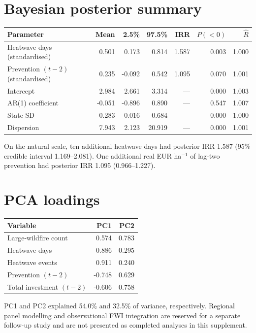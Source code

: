 \documentclass[10pt,a4paper]{article}
\begin{document}
\section{Bayesian posterior summary}
\begin{table}[H]\centering\small
\begin{tabular}{lrrrrrr}
\toprule
Parameter & Mean & 2.5\% & 97.5\% & IRR & $P(<0)$ & $\widehat R$ \\
\midrule
Heatwave days (standardised) & 0.501 & 0.173 & 0.814 & 1.587 & 0.003 & 1.000 \\
Prevention $(t-2)$ (standardised) & 0.235 & -0.092 & 0.542 & 1.095 & 0.070 & 1.001 \\
Intercept & 2.984 & 2.661 & 3.314 & --- & 0.000 & 1.003 \\
AR(1) coefficient & -0.051 & -0.896 & 0.890 & --- & 0.547 & 1.007 \\
State SD & 0.283 & 0.016 & 0.684 & --- & 0.000 & 1.000 \\
Dispersion & 7.943 & 2.123 & 20.919 & --- & 0.000 & 1.001 \\
\bottomrule
\end{tabular}
\end{table}

On the natural scale, ten additional heatwave days had posterior IRR 1.587 (95\% credible interval 1.169--2.081). One additional real EUR ha$^{-1}$ of lag-two prevention had posterior IRR 1.095 (0.966--1.227).

\section{PCA loadings}
\begin{table}[H]\centering\small
\begin{tabular}{lrr}
\toprule
Variable & PC1 & PC2 \\
\midrule
Large-wildfire count & 0.574 & 0.783 \\
Heatwave days & 0.886 & 0.295 \\
Heatwave events & 0.911 & 0.240 \\
Prevention $(t-2)$ & -0.748 & 0.629 \\
Total investment $(t-2)$ & -0.606 & 0.758 \\
\bottomrule
\end{tabular}
\end{table}

PC1 and PC2 explained 54.0\% and 32.5\% of variance, respectively. Regional panel modelling and observational FWI integration are reserved for a separate follow-up study and are not presented as completed analyses in this supplement.
\end{document}

